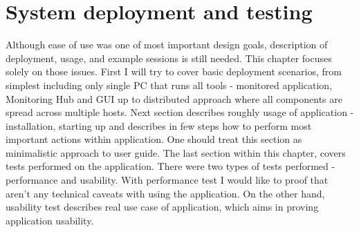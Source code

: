  
%


\chapter{System deployment and testing}
\label{cha:deployment}

\parbox{0.8\textwidth}{

{\small
Although ease of use was one of most important design goals, description of deployment, usage, and example sessions is still needed. This chapter focuses solely on those issues. First I will try to cover basic deployment scenarios, from simplest including only single PC that runs all tools - monitored application, Monitoring Hub and GUI up to distributed approach where all components are spread across multiple hosts. Next section describes roughly usage of application - installation, starting up and describes in few steps how to perform most important actions within application. One should treat this section as minimalistic approach to user guide. The last section within this chapter, covers tests performed on the application. There were two types of tests performed - performance and usability. With performance test I would like to proof that aren\rq{}t any technical caveats with using the application. On the other hand, usability test describes real use case of application, which aims in proving application usability. 
}
}









